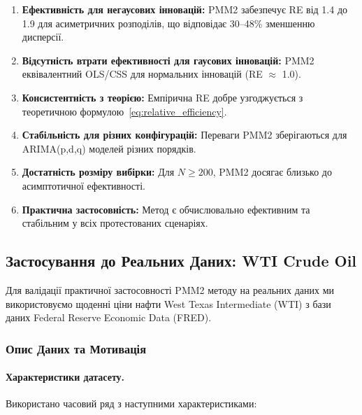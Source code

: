 \documentclass[12pt,a4paper]{article}
\begin{document}
\begin{enumerate}
    \item \textbf{Ефективність для негаусових інновацій:} PMM2 забезпечує RE від 1.4 до 1.9 для асиметричних розподілів, що відповідає 30--48\% зменшенню дисперсії.

    \item \textbf{Відсутність втрати ефективності для гаусових інновацій:} PMM2 еквівалентний OLS/CSS для нормальних інновацій (RE $\approx$ 1.0).

    \item \textbf{Консистентність з теорією:} Емпірична RE добре узгоджується з теоретичною формулою~\eqref{eq:relative_efficiency}.

    \item \textbf{Стабільність для різних конфігурацій:} Переваги PMM2 зберігаються для ARIMA(p,d,q) моделей різних порядків.

    \item \textbf{Достатність розміру вибірки:} Для $N \geq 200$, PMM2 досягає близько до асимптотичної ефективності.

    \item \textbf{Практична застосовність:} Метод є обчислювально ефективним та стабільним у всіх протестованих сценаріях.
\end{enumerate}

\subsection{Застосування до Реальних Даних: WTI Crude Oil}
\label{subsec:wti_application}

Для валідації практичної застосовності PMM2 методу на реальних даних ми використовуємо щоденні ціни нафти West Texas Intermediate (WTI) з бази даних Federal Reserve Economic Data (FRED).

\subsubsection{Опис Даних та Мотивація}
\label{subsubsec:wti_data_description}

\paragraph{Характеристики датасету.}
Використано часовий ряд з наступними характеристиками:
\end{document}
